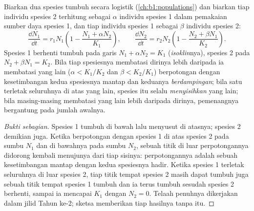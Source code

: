 \begin{proposition}\label{prop:b1:species-interactions:lotka}
Biarkan dua spesies tumbuh secara logistik (\cref{ch:b1:populations})
dan biarkan tiap individu spesies 2 terhitung sebagai $\alpha$ individu
spesies 1 dalam pemakaian sumber daya spesies 1, dan tiap individu
spesies 1 sebagai $\beta$ individu spesies 2:
\[
\frac{\dd N_1}{\dd t} = r_1 N_1\left(1 - \frac{N_1 + \alpha N_2}{K_1}\right),
\qquad
\frac{\dd N_2}{\dd t} = r_2 N_2\left(1 - \frac{N_2 + \beta N_1}{K_2}\right).
\]
Spesies 1 berhenti tumbuh pada garis $N_1 + \alpha N_2 = K_1$
(\emph{isoklin}nya), spesies 2 pada $N_2 + \beta N_1 = K_2$. Bila
tiap spesiesnya membatasi dirinya lebih daripada ia membatasi yang lain ($\alpha <
K_1/K_2$ dan $\beta < K_2/K_1$)  berpotongan dengan
kesetimbangan kedua spesiesnya mantap dan keduanya \emph{berdampingan};
bila satu  terletak seluruhnya di atas yang lain, spesies itu
selalu \emph{menyisihkan} yang lain; bila masing-masing membatasi yang
lain lebih daripada dirinya, pemenangnya bergantung pada jumlah awalnya.
\end{proposition}
\begin{proof}[Bukti sebagian]
Spesies 1 tumbuh di bawah  lalu menyusut di atasnya; spesies
2 demikian juga. Ketika  berpotongan dengan  spesies
1 di atas  spesies 2 pada sumbu $N_1$ dan di bawahnya pada
sumbu $N_2$, sebuah titik di luar perpotongannya didorong kembali
menujunya dari tiap sisinya: perpotongannya adalah sebuah kesetimbangan
mantap dengan kedua spesiesnya hadir. Ketika  spesies 1
terletak seluruhnya di luar  spesies 2, tiap titik tempat
spesies 2 masih dapat tumbuh juga sebuah titik tempat spesies 1 tumbuh
dan ia terus tumbuh sesudah spesies 2 berhenti, sampai ia mencapai
$K_1$ dengan $N_2 = 0$. Telaah penuhnya dikerjakan dalam jilid Tahun
ke-2; sketsa  memberikan tiap hasilnya tanpa itu.
\end{proof}

